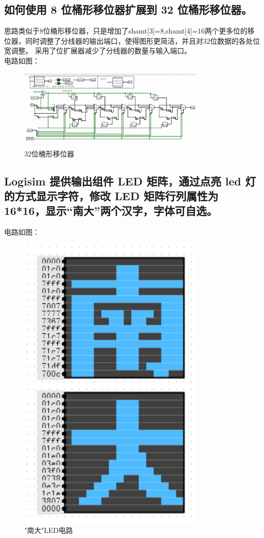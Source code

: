 \documentclass{article}
\begin{document}
    
    \subsection{如何使用 8 位桶形移位器扩展到 32 位桶形移位器。}
    思路类似于8位桶形移位器，只是增加了shamt[3]=8,shamt[4]=16两个更多位的移位器，同时调整了分线器的输出端口，使得图形更简洁，并且对32位数据的各处位宽调整。
    采用了位扩展器减少了分线器的数量与输入端口。\\
    电路如图：
    \begin{figure}[H]
    \centering
    \includegraphics[width=0.8\textwidth]{9.1.png}
    \caption{32位桶形移位器}
    \end{figure}

    \subsection{Logisim 提供输出组件 LED 矩阵，通过点亮 led 灯的方式显示字符，修改 LED 矩阵行列属性为 16*16，显示“南大”两个汉字，字体可自选。}
    电路如图：
    \begin{figure}[H]
    \centering
    \includegraphics[width=0.8\textwidth]{10.1.png}
    \caption{"南大"LED电路}
    \end{figure}
    
\end{document}
